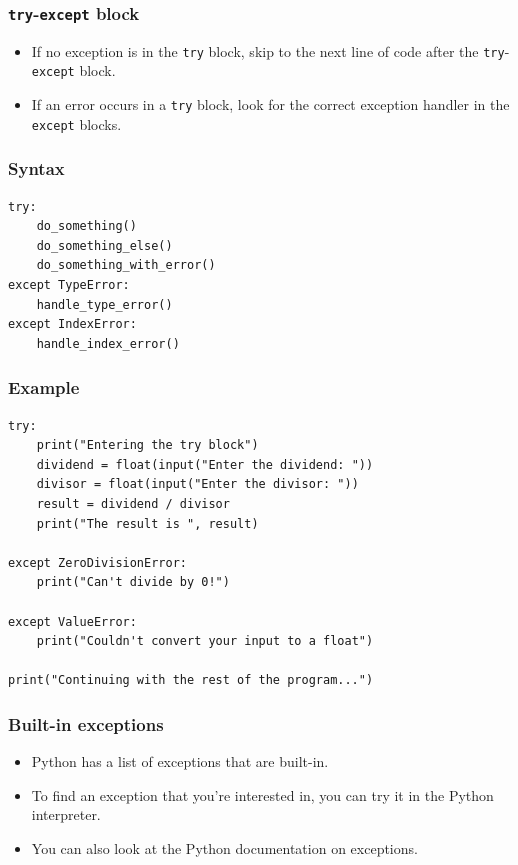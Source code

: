 \documentclass[11pt]{article}
\begin{document}
\subsubsection{\texttt{try}-\texttt{except} block}
\label{sec:orga9fdf16}
\begin{itemize}
\item If no exception is in the \texttt{try} block, skip to the next line of code after the \texttt{try}-\texttt{except} block.
\item If an error occurs in a \texttt{try} block, look for the correct exception handler in the \texttt{except} blocks.
\end{itemize}

\subsubsection{Syntax}
\label{sec:org537a652}
\begin{verbatim}
try:
    do_something()
    do_something_else()
    do_something_with_error()
except TypeError:
    handle_type_error()
except IndexError:
    handle_index_error()
\end{verbatim}

\subsubsection{Example}
\label{sec:org487f5b1}
\begin{verbatim}
try:
    print("Entering the try block")
    dividend = float(input("Enter the dividend: "))
    divisor = float(input("Enter the divisor: "))
    result = dividend / divisor
    print("The result is ", result)

except ZeroDivisionError:
    print("Can't divide by 0!")

except ValueError:
    print("Couldn't convert your input to a float")

print("Continuing with the rest of the program...")
\end{verbatim}

\subsubsection{Built-in exceptions}
\label{sec:org789eb71}
\begin{itemize}
\item Python has a list of exceptions that are built-in.
\item To find an exception that you're interested in, you can try it in the Python interpreter.
\item You can also look at the Python documentation on exceptions.
\end{itemize}
\end{document}
